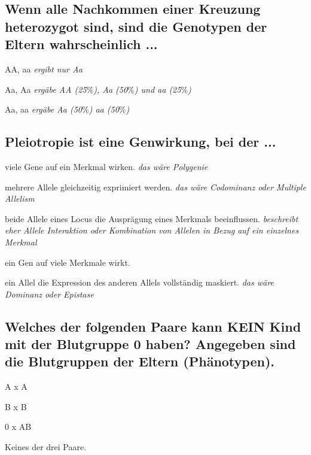 \documentclass{article}
\newcommand{\cmark}{\ding{51}}%
\newcommand{\done}{\rlap{$\square$}{\raisebox{2pt}{\large\hspace{1pt}\cmark}}%
\hspace{-2.5pt}}
\begin{document}
\subsection*{Wenn alle Nachkommen einer Kreuzung heterozygot sind, sind die
Genotypen der Eltern wahrscheinlich ...}
\begin{todolist} %
\item [\done] AA, aa \textit{\scriptsize ergibt nur Aa }
\item Aa, Aa \textit{\scriptsize ergäbe AA (25$\%$), Aa (50$\%$) und aa (25$\%$)}
\item Aa, aa \textit{\scriptsize ergäbe Aa (50$\%$)
aa (50$\%$)}
\end{todolist}
\subsection*{Pleiotropie ist eine Genwirkung, bei der ...}
\begin{todolist}%
\item viele Gene auf ein Merkmal wirken. \textit{\scriptsize das wäre Polygenie}
\item mehrere Allele gleichzeitig exprimiert werden. \textit{\scriptsize  das wäre Codominanz oder Multiple Allelism}
\item beide Allele eines Locus die Ausprägung eines Merkmals
beeinflussen. \textit{\scriptsize beschreibt eher Allele Interaktion oder Kombination von Allelen in Bezug auf ein einzelnes Merkmal}
\item[\done] ein Gen auf viele Merkmale wirkt.
\item ein Allel die Expression des anderen Allels vollständig maskiert. \textit{\scriptsize das wäre Dominanz oder Epistase}
\end{todolist}
\subsection*{Welches der folgenden Paare kann KEIN Kind mit der Blutgruppe 0
haben? Angegeben sind die Blutgruppen der Eltern (Phänotypen).}
\begin{todolist} %
\item [\done] A x A
\item [\done] B x B
\item [\done] 0 x AB
\item Keines der drei Paare.
\end{todolist}
\end{document}
